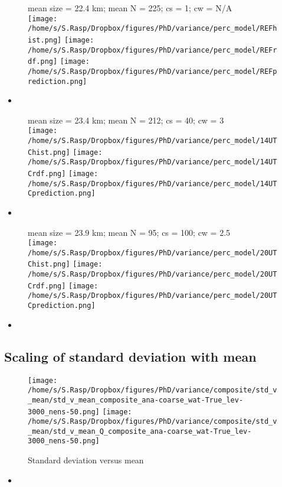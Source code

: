 \documentclass[a4paper, 12pt]{article}
\begin{document}
\begin{figure}[h!]
\noindent \centering
mean size = 22.4 km; mean N = 225; cs = 1; cw = N/A\\
\texttt{[image: /home/s/S.Rasp/Dropbox/figures/PhD/variance/perc\_model/REFhist.png]}
\texttt{[image: /home/s/S.Rasp/Dropbox/figures/PhD/variance/perc\_model/REFrdf.png]}
\texttt{[image: /home/s/S.Rasp/Dropbox/figures/PhD/variance/perc\_model/REFprediction.png]}
\end{figure}
\begin{itemize}
 \item 
\end{itemize}
\newpage

\begin{figure}[h!]
\noindent \centering
mean size = 23.4 km; mean N = 212; cs = 40; cw = 3\\
\texttt{[image: /home/s/S.Rasp/Dropbox/figures/PhD/variance/perc\_model/14UTChist.png]}
\texttt{[image: /home/s/S.Rasp/Dropbox/figures/PhD/variance/perc\_model/14UTCrdf.png]}
\texttt{[image: /home/s/S.Rasp/Dropbox/figures/PhD/variance/perc\_model/14UTCprediction.png]}
\end{figure}
\begin{itemize}
 \item 
\end{itemize}
\newpage

\begin{figure}[h!]
\noindent \centering
mean size = 23.9 km; mean N = 95; cs = 100; cw = 2.5\\
\texttt{[image: /home/s/S.Rasp/Dropbox/figures/PhD/variance/perc\_model/20UTChist.png]}
\texttt{[image: /home/s/S.Rasp/Dropbox/figures/PhD/variance/perc\_model/20UTCrdf.png]}
\texttt{[image: /home/s/S.Rasp/Dropbox/figures/PhD/variance/perc\_model/20UTCprediction.png]}
\end{figure}
\begin{itemize}
 \item 
\end{itemize}
\newpage


\subsection{Scaling of standard deviation with mean}
\begin{figure}[h!]
\noindent \centering
\texttt{[image: /home/s/S.Rasp/Dropbox/figures/PhD/variance/composite/std\_v\_mean/std\_v\_mean\_composite\_ana-coarse\_wat-True\_lev-3000\_nens-50.png]}
\texttt{[image: /home/s/S.Rasp/Dropbox/figures/PhD/variance/composite/std\_v\_mean/std\_v\_mean\_Q\_composite\_ana-coarse\_wat-True\_lev-3000\_nens-50.png]}\\
\caption{Standard deviation versus mean} \label{fig:geographical}
\end{figure}
\begin{itemize}
 \item 
\end{itemize}
\end{document}
